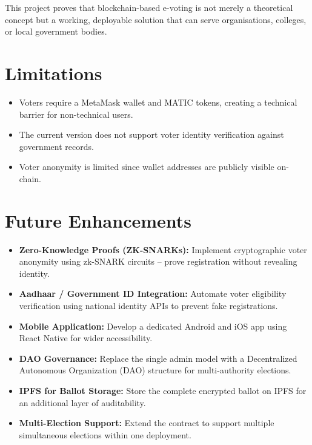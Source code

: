 \documentclass[12pt,a4paper]{report}
\begin{document}
This project proves that blockchain-based e-voting is not merely a theoretical
concept but a working, deployable solution that can serve organisations, colleges,
or local government bodies.

\section{Limitations}

\begin{itemize}
\item Voters require a MetaMask wallet and MATIC tokens, creating a technical barrier
      for non-technical users.
\item The current version does not support voter identity verification against
      government records.
\item Voter anonymity is limited since wallet addresses are publicly visible on-chain.
\end{itemize}

\section{Future Enhancements}

\begin{itemize}
\item \textbf{Zero-Knowledge Proofs (ZK-SNARKs):} Implement cryptographic
      voter anonymity using zk-SNARK circuits -- prove registration without revealing identity.
\item \textbf{Aadhaar / Government ID Integration:} Automate voter eligibility
      verification using national identity APIs to prevent fake registrations.
\item \textbf{Mobile Application:} Develop a dedicated Android and iOS app using
      React Native for wider accessibility.
\item \textbf{DAO Governance:} Replace the single admin model with a
      Decentralized Autonomous Organization (DAO) structure for multi-authority elections.
\item \textbf{IPFS for Ballot Storage:} Store the complete encrypted ballot on IPFS
      for an additional layer of auditability.
\item \textbf{Multi-Election Support:} Extend the contract to support multiple
      simultaneous elections within one deployment.
\end{itemize}

\end{document}
